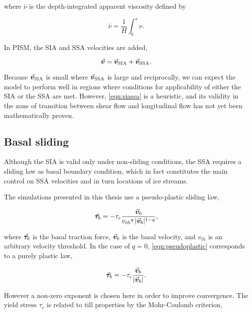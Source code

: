 \documentclass{article}
\newcommand{\vect}[1]{\va*{#1}} %
\newcommand{\vv}[0]{\vect{v}}           %
\newcommand{\vsia}[0]{\vv_{\mathrm{SIA}}}   %
\newcommand{\vssa}[0]{\vv_{\mathrm{SSA}}}   %
\begin{document}
where $\bar{\nu}$ is the depth-integrated apparent viscosity defined by

\begin{equation}
    \bar{\nu} = \frac{1}{H}\int_b^s\nu.
\end{equation}

In PISM, the SIA and SSA velocities are added,

\begin{equation}
    \label{eqn:siassa}
    \vv = \vsia + \vssa.
\end{equation}

Because $\vsia$ is small where $\vssa$ is large and
reciprocally, we can expect the model to perform well in regions where
conditions for applicability of either the SIA or the SSA are met. However,
\cref{eqn:siassa} is a heuristic, and its validity in the zone of
transition between shear flow and longitudinal flow has not yet been
mathematically proven.

\subsection{Basal sliding}

Although the SIA is valid only under non-sliding conditions, the SSA requires
a sliding law as basal boundary condition, which in fact constitutes the main
control on SSA velocities and in turn locations of ice streams.

The simulations presented in this thesis use a pseudo-plastic sliding law,

\begin{equation}
    \label{eqn:pseudoplastic}
    \vect{\tau}_b = -\tau_c \frac{\vv_b}{{v_{th}}^q\,|\vv_b|^{1-q}},
\end{equation}

where $\vect{\tau}_b$ is the basal traction force, $\vv_b$ is the basal
velocity, and $v_{th}$ is an arbitrary velocity threshold. In the case of
$q=0$, \cref{eqn:pseudoplastic} corresponds to a purely plastic law,

\begin{equation}
    \label{eqn:plastic}
    \vect{\tau}_b = -\tau_c \frac{\vv_b}{|\vv_b|}.
\end{equation}

However a non-zero exponent is chosen here in order to improve convergence. The
yield stress $\tau_c$ is related to till properties by the Mohr-Coulomb
criterion,
\end{document}
